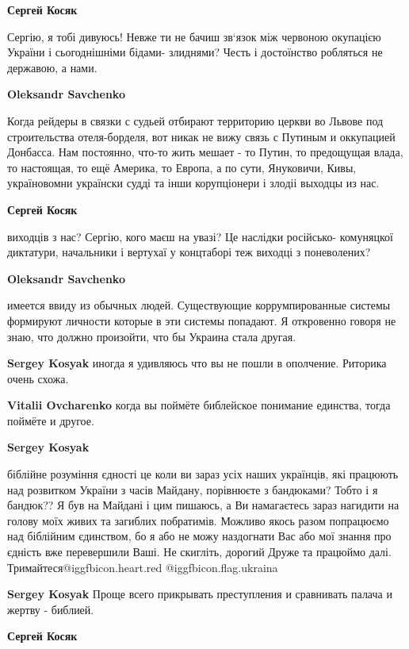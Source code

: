 \begin{itemize}
\begin{itemize}
\textbf{Сергей Косяк} 

Сергію, я тобі дивуюсь! Невже ти не бачиш зв‘язок між червоною окупацією
України і сьогоднішніми бідами- злиднями? Честь і достоїнство робляться не
державою, а нами.

\textbf{Oleksandr Savchenko} 

Когда рейдеры в связки с судьей отбирают территорию церкви во Львове под
строительства отеля-борделя, вот никак не вижу связь с Путиным и оккупацией
Донбасса. Нам постоянно, что-то жить мешает - то Путин, то предощущая влада, то
настоящая, то ещё Америка, то Европа, а по сути, Януковичи, Кивы, україновомни
українски судді та інши корупціонери і злодіі выходцы из нас.

\textbf{Сергей Косяк} 

виходців з нас? Сергію, кого маєш на увазі? Це наслідки російсько- комуняцкої
диктатури, начальники і вертухаї у концтаборі теж виходці з поневолених?

\textbf{Oleksandr Savchenko} 

имеется ввиду из обычных людей. Существующие коррумпированные системы формируют
личности которые в эти системы попадают. Я откровенно говоря не знаю, что
должно произойти, что бы Украина стала другая.

\textbf{Sergey Kosyak} иногда я удивляюсь что вы не пошли в ополчение. Риторика очень схожа.

\textbf{Vitalii Ovcharenko} когда вы поймёте библейское понимание единства, тогда поймёте и другое.

\textbf{Sergey Kosyak} 

біблійне розуміння єдності це коли ви зараз усіх наших українців, які працюють
над розвитком України з часів Майдану, порівнюєте з бандюками? Тобто і я
бандюк?? Я був на Майдані і цим пишаюсь, а Ви намагаєтесь зараз нагидити на
голову моїх живих та загиблих побратимів. Можливо якось разом попрацюємо над
біблійним єдинством, бо я або не можу наздогнати Вас або мої знання про єдність
вже перевершили Ваші. Не скигліть, дорогий Друже та працюймо далі.
Тримайтеся@igg{fbicon.heart.red} @igg{fbicon.flag.ukraina}

\textbf{Sergey Kosyak} Проще всего прикрывать преступления и сравнивать палача и жертву - библией.

\textbf{Сергей Косяк} 


\end{itemize}
\end{itemize}
